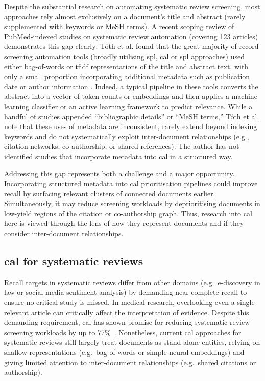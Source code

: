 \documentclass[10pt,oneside]{book}
\begin{document}
Despite the substantial research on automating systematic review screening, most approaches rely almost exclusively on a document’s title and abstract (rarely supplemented with keywords or MeSH terms). A recent scoping review of PubMed-indexed studies on systematic review automation (covering 123 articles) demonstrates this gap clearly: Tóth et al. found that the great majority of record-screening automation tools (broadly utilising \gls*{spl}, \gls*{cal} or \gls*{spl} approaches) used either bag-of-words or \gls*{tfidf} representations of the title and abstract text, with only a small proportion incorporating additional metadata such as publication date or author information \cite{toth_automation_2024}. Indeed, a typical pipeline in these tools converts the abstract into a vector of token counts or embeddings and then applies a machine learning classifier or an active learning framework to predict relevance. While a handful of studies appended ``bibliographic details” or ``MeSH terms,” Tóth et al. note that these uses of metadata are inconsistent, rarely extend beyond indexing keywords and do not systematically exploit inter-document relationships (e.g., citation networks, co-authorship, or shared references). The author has not identified studies that incorporate metadata into \gls*{cal} in a structured way. 

Addressing this gap represents both a challenge and a major opportunity. Incorporating structured metadata into \gls*{cal} prioritisation pipelines could improve recall by surfacing relevant clusters of connected documents earlier. Simultaneously, it may reduce screening workloads by deprioritising documents in low-yield regions of the citation or co-authorship graph. Thus, research into \gls*{cal} here is viewed through the lens of how they represent documents and if they consider inter-document relationships.  

\subsection{\gls*{cal} for systematic reviews}

Recall targets in systematic reviews differ from other domains (e.g.\ e-discovery in law or social-media sentiment analysis) by demanding near-complete recall to ensure no critical study is missed. In medical research, overlooking even a single relevant article can critically affect the interpretation of evidence. Despite this demanding requirement, \gls*{cal} has shown promise for reducing systematic review screening workloads by up to 77\%~\cite{van_der_vet_propagation_2016}. Nonetheless, current \gls*{cal} approaches for systematic reviews still largely treat documents as stand-alone entities, relying on shallow representations (e.g.\ bag-of-words or simple neural embeddings) and giving limited attention to inter-document relationships (e.g.\ shared citations or authorship).
\end{document}
